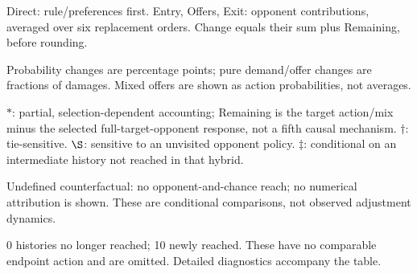 \documentclass[10pt]{article}
\begin{document}
{\footnotesize Direct: rule/preferences first. Entry, Offers, Exit: opponent contributions, averaged over six replacement orders. Change equals their sum plus Remaining, before rounding.\par
Probability changes are percentage points; pure demand/offer changes are fractions of damages. Mixed offers are shown as action probabilities, not averages.\par
$*$: partial, selection-dependent accounting; Remaining is the target action/mix minus the selected full-target-opponent response, not a fifth causal mechanism. $\dagger$: tie-sensitive. $\S$: sensitive to an unvisited opponent policy. $\ddagger$: conditional on an intermediate history not reached in that hybrid.\par
Undefined counterfactual: no opponent-and-chance reach; no numerical attribution is shown. These are conditional comparisons, not observed adjustment dynamics.\par
0 histories no longer reached; 10 newly reached. These have no comparable endpoint action and are omitted. Detailed diagnostics accompany the table.}\par
\end{document}
